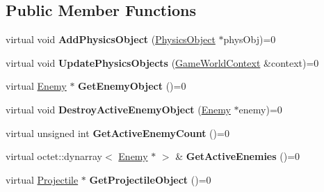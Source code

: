 \subsection*{Public Member Functions}
\begin{DoxyCompactItemize}
\item 
\hypertarget{class_arena_1_1_i_object_pool_aec30ccd077b5c9f321b36c68d303b0e9}{virtual void {\bfseries Add\+Physics\+Object} (\hyperlink{class_arena_1_1_physics_object}{Physics\+Object} $\ast$phys\+Obj)=0}\label{class_arena_1_1_i_object_pool_aec30ccd077b5c9f321b36c68d303b0e9}

\item 
\hypertarget{class_arena_1_1_i_object_pool_ad9f624014850aea0214dd909959701b5}{virtual void {\bfseries Update\+Physics\+Objects} (\hyperlink{struct_arena_1_1_game_world_context}{Game\+World\+Context} \&context)=0}\label{class_arena_1_1_i_object_pool_ad9f624014850aea0214dd909959701b5}

\item 
\hypertarget{class_arena_1_1_i_object_pool_a017a4c841aa289c03759e8e9e4f5b69b}{virtual \hyperlink{class_arena_1_1_enemy}{Enemy} $\ast$ {\bfseries Get\+Enemy\+Object} ()=0}\label{class_arena_1_1_i_object_pool_a017a4c841aa289c03759e8e9e4f5b69b}

\item 
\hypertarget{class_arena_1_1_i_object_pool_a1fcd5819f41e7f6d625adc704e748afe}{virtual void {\bfseries Destroy\+Active\+Enemy\+Object} (\hyperlink{class_arena_1_1_enemy}{Enemy} $\ast$enemy)=0}\label{class_arena_1_1_i_object_pool_a1fcd5819f41e7f6d625adc704e748afe}

\item 
\hypertarget{class_arena_1_1_i_object_pool_a7fa6f78a8cea83bed62343600f167832}{virtual unsigned int {\bfseries Get\+Active\+Enemy\+Count} ()=0}\label{class_arena_1_1_i_object_pool_a7fa6f78a8cea83bed62343600f167832}

\item 
\hypertarget{class_arena_1_1_i_object_pool_a5cf7b6bc698282c3ea748329f402a141}{virtual octet\+::dynarray$<$ \hyperlink{class_arena_1_1_enemy}{Enemy} $\ast$ $>$ \& {\bfseries Get\+Active\+Enemies} ()=0}\label{class_arena_1_1_i_object_pool_a5cf7b6bc698282c3ea748329f402a141}

\item 
\hypertarget{class_arena_1_1_i_object_pool_a6f18bbffa058f8a0c5f81db443581e02}{virtual \hyperlink{class_arena_1_1_projectile}{Projectile} $\ast$ {\bfseries Get\+Projectile\+Object} ()=0}\label{class_arena_1_1_i_object_pool_a6f18bbffa058f8a0c5f81db443581e02}


\end{DoxyCompactItemize}
